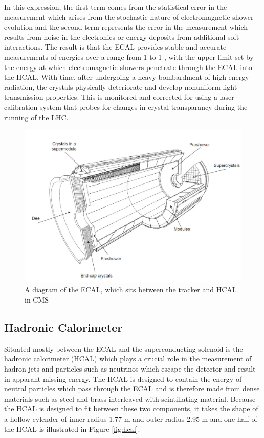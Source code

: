 In this expression, the first term comes from the statistical error 
 in the measurement which arises
 from the stochastic nature of electromagnetic shower evolution
 and the second term represents the error in the measurement
 which results from noise in the electronics or
 energy deposits from additional soft interactions.
The result is that the ECAL provides stable and accurate
 measurements of energies over a range from 1 \GeV to 1 \TeV, 
 with the upper limit set by the energy at which electromagnetic showers
 penetrate through the ECAL into the HCAL.
With time, after undergoing a heavy bombardment of high energy radiation,
 the \pbw crystals physically deteriorate and develop 
 nonuniform light transmission properties. 
This is monitored and corrected for using a laser calibration system
 that probes for changes in crystal transparancy
 during the running of the LHC.

\begin{figure}[htbp]
\includegraphics[width=\textwidth]{pdfs/experiment/cms_ecal.pdf}
\caption{
 A diagram of the ECAL, which sits between the tracker and HCAL
  in CMS
 }
\label{fig:ecal}
\end{figure}
 

 \subsection{Hadronic Calorimeter}
Situated mostly between the ECAL and the superconducting solenoid
 is the hadronic calorimeter (HCAL) which plays a
 crucial role in the measurement of hadron jets
 and particles such as neutrinos which escape the detector
 and result in apparant missing energy.
The HCAL is designed to contain the energy of neutral
 particles which pass through the ECAL and is therefore made
 from dense materials such as 
 steel and brass interleaved with scintillating material.
Because the HCAL is designed to fit between these
 two components, it takes the shape of a hollow
 cylender of inner radius 1.77 m and outer radius 2.95 m
 and one half of the HCAL is illustrated in Figure \ref{fig:hcal}.

